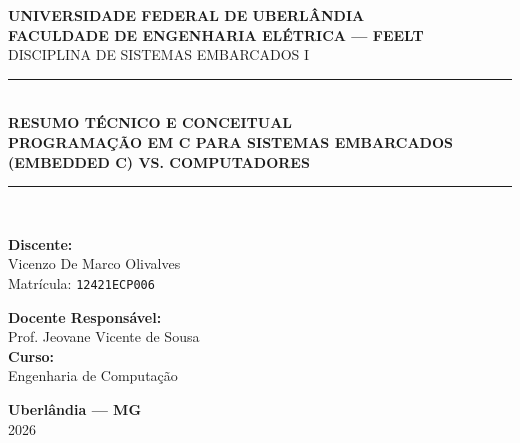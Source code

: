 \documentclass[12pt, a4paper]{article}
\begin{document}
\begin{titlepage}
    \centering
    
    {\bfseries \Large UNIVERSIDADE FEDERAL DE UBERLÂNDIA}\\[0.2cm]
    {\bfseries \large FACULDADE DE ENGENHARIA ELÉTRICA — FEELT}\\[0.1cm]
    {\small DISCIPLINA DE SISTEMAS EMBARCADOS I}\\[2.0cm]

    {\color{primaryblue}\rule{\linewidth}{1.0pt}}\\[0.4cm]
    {\Large \bfseries \color{primaryblue} RESUMO TÉCNICO E CONCEITUAL}\\[0.3cm]
    {\normalsize \bfseries PROGRAMAÇÃO EM C PARA SISTEMAS EMBARCADOS (EMBEDDED C) VS. COMPUTADORES}\\[0.4cm]
    {\color{primaryblue}\rule{\linewidth}{1.0pt}}\\[2.5cm]

    \begin{minipage}{0.5\textwidth}
        \begin{flushleft} \large
            \textbf{Discente:}\\[0.2cm]
            Vicenzo De Marco Olivalves\\[0.1cm]
            Matrícula: \texttt{12421ECP006}
        \end{flushleft}
    \end{minipage}
    \hfill
    \begin{minipage}{0.45\textwidth}
        \begin{flushright} \large
            \textbf{Docente Responsável:}\\[0.2cm]
            Prof. Jeovane Vicente de Sousa\\[0.4cm]
            \textbf{Curso:}\\
            Engenharia de Computação
        \end{flushright}
    \end{minipage}

    \vfill
    {\large \bfseries Uberlândia — MG}\\[0.2cm]
    {\large 2026}
\end{titlepage}

\end{document}
